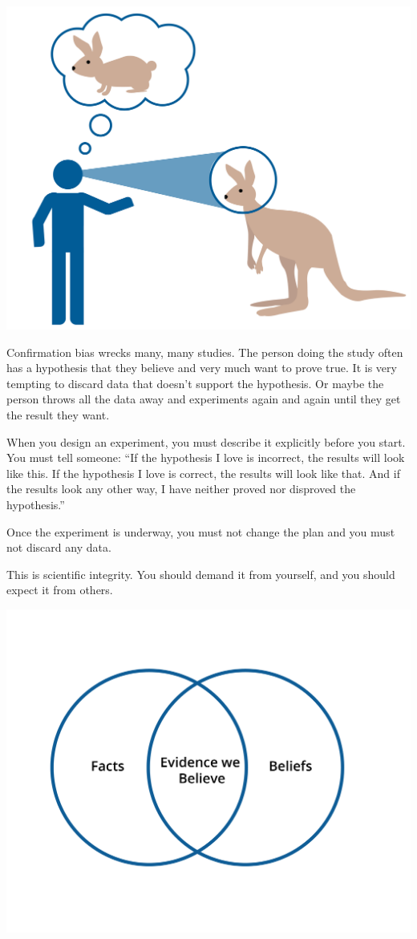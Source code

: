 \includegraphics[width=1\textwidth]{confirmationBias.png}


Confirmation bias wrecks many, many studies. The person doing the
study often has a hypothesis that they believe and very much want to
prove true. It is very tempting to discard data that doesn't support
the hypothesis. Or maybe the person throws all the data away and experiments again and again until they get the result they want.

When you design an experiment, you must describe it explicitly before
you start. You must tell someone: ``If the hypothesis I love is
incorrect, the results will look like this.  If the hypothesis I love
is correct, the results will look like that. And if the results look
any other way, I have neither proved nor disproved the hypothesis.''

Once the experiment is underway, you must not change the plan and you
must not discard any data.

This is scientific integrity. You should demand it from yourself, and
you should expect it from others.

\includegraphics[width=1\textwidth]{confirmationBias2.png}


